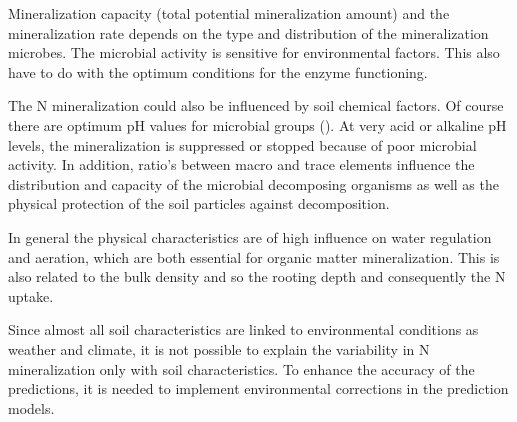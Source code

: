 \documentclass[10pt,twoside,dutch,english]{report}
\begin{document}
Mineralization capacity (total potential mineralization amount) and  the mineralization rate depends on the type and distribution of the mineralization microbes. The microbial activity is sensitive for environmental factors. This also have to do with the optimum conditions for the enzyme functioning. 

The N mineralization could also be influenced by soil chemical factors. Of course there are optimum pH values for microbial groups (\citep{Smith1996}). At very acid or alkaline pH levels, the mineralization is suppressed or stopped because of poor microbial activity. In addition, ratio's between macro and trace elements influence the distribution and capacity of the microbial decomposing organisms as well as the physical protection of the soil particles against decomposition. 

In general the physical characteristics are of high influence on water regulation and aeration, which are both essential for organic matter mineralization. This is also related to the bulk density and so the rooting depth and consequently the N uptake. 

Since almost all soil characteristics are linked to environmental conditions as weather and climate, it is not possible to explain the variability in N mineralization only with soil characteristics. To enhance the accuracy of the predictions, it is needed to implement environmental corrections in the prediction models. 

                    

\end{document}
